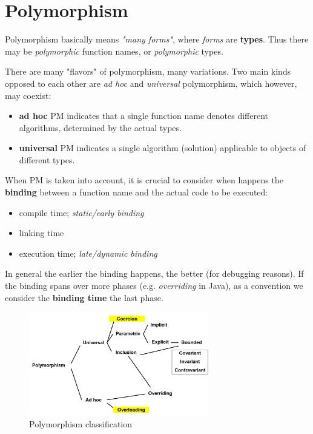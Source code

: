 \chapter{Polymorphism}
Polymorphism basically means \textit{"many forms"}, where \textit{forms} are \textbf{types}.
Thus there may be \textit{polymorphic} function names, or \textit{polymorphic} types.

There are many "flavors" of polymorphism, many variations.
Two main kinds opposed to each other are \textit{ad hoc} and \textit{universal} polymorphism, which however, may coexist:
\begin{itemize}
    \item \textbf{ad hoc} PM indicates that a single function name denotes different algorithms, determined by the actual types.
    \item \textbf{universal} PM indicates a single algorithm (solution) applicable to objects of different types.
\end{itemize}

When PM is taken into account, it is crucial to consider when happens the \textbf{binding} between a function name and the actual code to be executed:
\begin{itemize}
    \item compile time; \textit{static/early binding}
    \item linking time
    \item execution time; \textit{late/dynamic binding}
\end{itemize}
In general the earlier the binding happens, the better (for debugging reasons).
If the binding spans over more phases (e.g. \textit{overriding} in Java), as a convention we consider the \textbf{binding time} the last phase.

\begin{figure}[h]
    \centering
    \includegraphics[width=0.7\textwidth]{images/polymorphism.png}
    \caption{Polymorphism classification}
    \label{fig:polymorphism_classification}
\end{figure}
